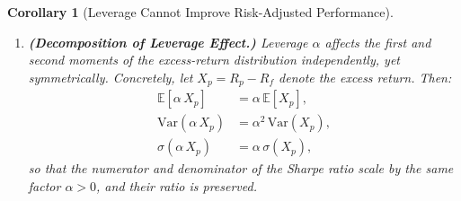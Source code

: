 \documentclass[12pt,openany]{book}
\newcommand{\E}{\mathbb{E}}
\numberwithin{equation}{chapter}
\theoremstyle{plain}
\newtheorem{corollary}[theorem]{Corollary}
\theoremstyle{definition}
\theoremstyle{remark}
\numberwithin{equation}{chapter}
\theoremstyle{plain}
\begin{document}
\begin{corollary}[Leverage Cannot Improve Risk-Adjusted Performance]
\begin{enumerate}
  \item \textbf{(Decomposition of Leverage Effect.)}
        Leverage $\alpha$ affects the first and second moments
        of the excess-return distribution independently, yet
        symmetrically.  Concretely, let
        $X_p = R_p - R_f$ denote the excess return.  Then:
        \begin{align}
          \E[\alpha\,X_p]
            &= \alpha\,\E[X_p],
          \label{eq:cor-mean} \\
          \mathrm{Var}(\alpha\,X_p)
            &= \alpha^{2}\,\mathrm{Var}(X_p),
          \label{eq:cor-var} \\
          \sigma(\alpha\,X_p)
            &= \alpha\,\sigma(X_p),
          \label{eq:cor-std}
        \end{align}
        so that the numerator and denominator of the Sharpe
        ratio scale by the same factor $\alpha > 0$, and
        their ratio is preserved.


\end{enumerate}
\end{corollary}
\end{document}
